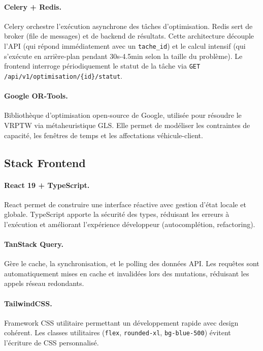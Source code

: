 \documentclass[12pt,a4paper]{report}
\begin{document}
\paragraph{Celery + Redis.}
Celery orchestre l'exécution asynchrone des tâches d'optimisation. Redis sert de broker (file de messages) et de backend de résultats. Cette architecture découple l'API (qui répond immédiatement avec un \texttt{tache\_id}) et le calcul intensif (qui s'exécute en arrière-plan pendant 30s-4.5min selon la taille du problème). Le frontend interroge périodiquement le statut de la tâche via \texttt{GET /api/v1/optimisation/\{id\}/statut}.

\paragraph{Google OR-Tools.} \cite{ortools}
Bibliothèque d'optimisation open-source de Google, utilisée pour résoudre le VRPTW via métaheuristique GLS. Elle permet de modéliser les contraintes de capacité, les fenêtres de temps et les affectations véhicule-client.

\subsection{Stack Frontend}

\paragraph{React 19 + TypeScript.} \cite{react}
React permet de construire une interface réactive avec gestion d'état locale et globale. TypeScript apporte la sécurité des types, réduisant les erreurs à l'exécution et améliorant l'expérience développeur (autocomplétion, refactoring).

\paragraph{TanStack Query.}
Gère le cache, la synchronisation, et le polling des données API. Les requêtes sont automatiquement mises en cache et invalidées lors des mutations, réduisant les appels réseau redondants.

\paragraph{TailwindCSS.}
Framework CSS utilitaire permettant un développement rapide avec design cohérent. Les classes utilitaires (\texttt{flex}, \texttt{rounded-xl}, \texttt{bg-blue-500}) évitent l'écriture de CSS personnalisé.
\end{document}
